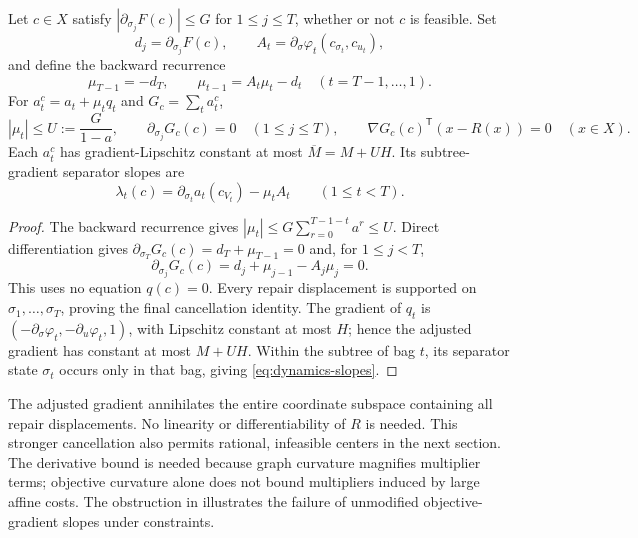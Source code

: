\begin{lemma}\label{lem:dynamics-adjoint}
Let $c\in X$ satisfy $|\partial_{\sigma_j}F(c)|\le G$ for
$1\le j\le T$, whether or not $c$ is feasible. Set
\[
 d_j=\partial_{\sigma_j}F(c),\qquad
 A_t=\partial_\sigma\varphi_t(c_{\sigma_t},c_{u_t}),
\]
and define the backward recurrence
\begin{equation}\label{eq:dynamics-adjoint}
 \mu_{T-1}=-d_T,\qquad
 \mu_{t-1}=A_t\mu_t-d_t\quad(t=T-1,\ldots,1).
\end{equation}
For $a_t^c=a_t+\mu_tq_t$ and $G_c=\sum_ta_t^c$,
\begin{equation}\label{eq:dynamics-adjoint-cancel}
 |\mu_t|\le U:=\frac G{1-a},\qquad
 \partial_{\sigma_j}G_c(c)=0\quad(1\le j\le T),\qquad
 \nabla G_c(c)^{\mathsf T}(x-R(x))=0\quad(x\in X).
\end{equation}
Each $a_t^c$ has gradient-Lipschitz constant at most
$\overline M=M+UH$. Its subtree-gradient separator slopes are
\begin{equation}\label{eq:dynamics-slopes}
 \lambda_t(c)=\partial_{\sigma_t}a_t(c_{V_t})-\mu_t A_t
 \qquad(1\le t<T).
\end{equation}
\end{lemma}
\begin{proof}
The backward recurrence gives
$|\mu_t|\le G\sum_{r=0}^{T-1-t}a^r\le U$. Direct differentiation
gives $\partial_{\sigma_T}G_c(c)=d_T+\mu_{T-1}=0$ and, for
$1\le j<T$,
\[
 \partial_{\sigma_j}G_c(c)=d_j+\mu_{j-1}-A_j\mu_j=0.
\]
This uses no equation $q(c)=0$. Every repair displacement is supported
on $\sigma_1,\ldots,\sigma_T$, proving the final cancellation identity.
The gradient of $q_t$ is
$(-\partial_\sigma\varphi_t,-\partial_u\varphi_t,1)$, with Lipschitz
constant at most $H$; hence the adjusted gradient has constant at most
$M+UH$. Within the subtree of bag $t$, its separator state $\sigma_t$
occurs only in that bag, giving \eqref{eq:dynamics-slopes}.
\end{proof}

The adjusted gradient annihilates the entire coordinate subspace containing
all repair displacements. No linearity or differentiability of $R$ is
needed. This stronger cancellation also permits rational, infeasible
centers in the next section. The derivative bound is needed because graph
curvature magnifies multiplier terms; objective curvature alone does not
bound multipliers induced by large affine costs. The obstruction in
 illustrates the failure of unmodified
objective-gradient slopes under constraints.

